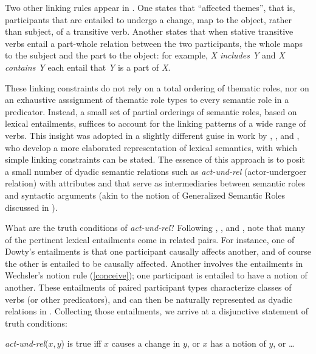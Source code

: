 \documentclass[output=paper
 	        ,biblatex
                ,babelshorthands
                ,newtxmath
                ,draftmode
                ,colorlinks, citecolor=brown
]{langscibook}
\begin{document}
Two other linking rules appear in \citet{Wechsler1995b}.  One states that ``affected themes'', that
is, participants that are entailed to undergo a change, map to the object, rather than subject, of a
transitive verb.  Another states that when stative transitive verbs entail a part-whole relation
between the two participants, the whole maps to the subject and the part to the object: for example,
\textit{X includes Y} and \textit{X contains Y} each entail that \textit{Y} is a part of \textit{X}.

These linking constraints do not rely on a total ordering of thematic roles, nor on an exhaustive
asssignment of thematic role types to every semantic role in a predicator. Instead, a small set of
partial orderings of semantic roles, based on lexical entailments, suffices
to account for the linking patterns of a wide range of verbs.  This insight was adopted in a
slightly different guise in work by \citet{Davis1996}, \citet{Davis2001}, and
\citet{DavisandKoenig2000b}, who develop a more elaborated representation of lexical semantics, with
which simple linking constraints can be stated.  The essence of this approach is to posit a small
number of dyadic semantic relations such as \textit{act-und-rel} (actor-undergoer relation) with
attributes  and  that serve as
intermediaries between semantic roles and syntactic arguments (akin to the notion of Generalized
Semantic Roles discussed in \citealt{VanValin1999}).

What are the truth conditions of \textit{act-und-rel}?  Following \citet{Fillmore1977},
\citet{Dowty1991}, and \citet{Wechsler1995b}, \citeauthor{DavisandKoenig2000b} note that many of the pertinent
lexical entailments come in related pairs.  For instance, one of Dowty's entailments is that one
participant causally affects another, and of course the other is entailed to be causally affected.
Another involves the entailments in Wechsler's notion rule (\ref{conceive}); one participant is
entailed to have a notion of another.  These entailments of paired participant types characterize
classes of verbs (or other predicators), and can then be naturally represented as dyadic relations
in .  Collecting those entailments, we arrive at a disjunctive statement of truth
conditions:

\eanoraggedright
\label{def-act-und-rel}
\textit{act-und-rel}($x,y$) is true iff $x$ causes a change in $y$, or $x$ has a notion of $y$, or \ldots
\z
\end{document}
